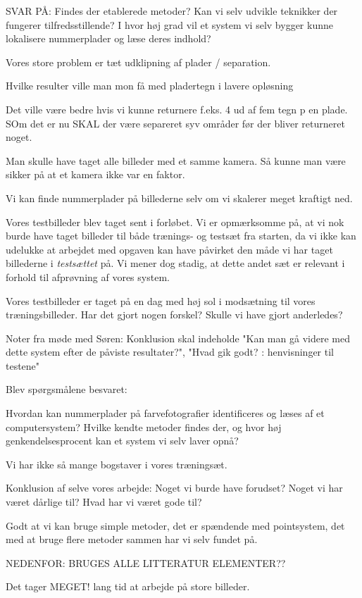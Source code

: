\documentclass[11pt,a4paper,final]{article}
\begin{document}
SVAR PÅ:
Findes der etablerede metoder?
Kan vi selv udvikle teknikker der fungerer tilfredsstillende?
I hvor høj grad vil et system vi selv bygger kunne lokalisere nummerplader og læse deres indhold?

Vores store problem er tæt udklipning af plader / separation.

Hvilke resulter ville man mon få med pladertegn i lavere opløsning

Det ville være bedre hvis vi kunne returnere f.eks. 4 ud af fem tegn p en plade. SOm det er nu SKAL der være separeret syv områder før der bliver returneret noget.

Man skulle have taget alle billeder med et samme kamera. Så kunne man være sikker på at et kamera ikke var en faktor.

Vi kan finde nummerplader på billederne selv om vi skalerer meget kraftigt ned.

Vores testbilleder blev taget sent i forløbet. Vi er opmærksomme på, at vi nok burde have taget  billeder til både trænings- og testsæt fra starten, da vi ikke kan udelukke at arbejdet med opgaven kan have påvirket den måde vi har taget billederne i \textit{testsættet} på. Vi mener dog stadig, at dette andet sæt er relevant i forhold til afprøvning af vores system.

Vores testbilleder er taget på en dag med høj sol i modsætning til vores træningsbilleder. Har det gjort nogen forskel? Skulle vi have gjort anderledes?

Noter fra møde med Søren: Konklusion skal indeholde "Kan man gå videre med dette system efter de påviste resultater?", "Hvad gik godt? : henvisninger til testene"

Blev spørgsmålene besvaret:

Hvordan kan nummerplader på farvefotografier identificeres og læses af et computersystem? Hvilke kendte metoder findes der, og hvor høj genkendelsesprocent kan et system vi selv laver opnå?

Vi har ikke så mange bogstaver i vores træningsæt.

Konklusion af selve vores arbejde: Noget vi burde have forudset? Noget vi har været dårlige til? Hvad har vi været gode til?

Godt at vi kan bruge simple metoder, det er spændende med pointsystem, det med at bruge flere metoder sammen har vi selv fundet på.

NEDENFOR: BRUGES ALLE LITTERATUR ELEMENTER??

Det tager MEGET! lang tid at arbejde på store billeder.
\end{document}
